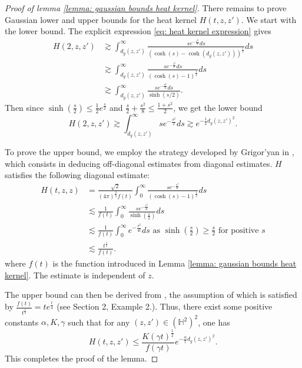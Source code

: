 \documentclass[letterpaper,11pt]{amsart}
\theoremstyle{note}
\numberwithin{equation}{section}
\begin{document}
\begin{proof}[Proof of lemma \ref{lemma: gaussian bounds heat kernel}]
    There remains to prove Gaussian lower and upper bounds for the heat kernel $H(t,z,z')$. We start with the lower bound. The explicit expression \eqref{eq: heat kernel expression} gives $$\begin{aligned}
        H(2,z,z') &\gtrsim \int_{d_g(z,z')}^\infty \frac{se^{-\frac{s^2}{8}}ds}{\left(\cosh(s) - \cosh(d_g(z,z'))\right)^\frac{1}{2}} ds \\
        &\gtrsim \int_{d_g(z,z')}^\infty \frac{se^{-\frac{s^2}{8}}ds}{\left(\cosh(s) - 1\right)^\frac{1}{2}} ds \\
        &\gtrsim \int_{d_g(z,z')}^\infty \frac{se^{-\frac{s^2}{8}}ds}{\sinh(s/2)}.
    \end{aligned}$$ Then since $\sinh(\frac{s}{2}) \leq \frac{1}{2} e^{\frac{s}{2}}$ and $\frac{s}{2} + \frac{s^2}{8} \leq \frac{1+s^2}{2}$, we get the lower bound $$H(2,z,z') \gtrsim \int_{d_g(z,z')}^\infty se^{-\frac{s^2}{2}} ds \gtrsim e^{-\frac{1}{2} d_g(z,z')^2}.$$

    To prove the upper bound, we employ the strategy developed by Grigor'yan in \cite[Section 5.1]{grigor'yan1997gaussianbounds,grigor'yan1999estimates_heatkernel_mfds}, which consists in deducing off-diagonal estimates from diagonal estimates. $H$ satisfies the following diagonal estimate: \begin{equation}
        \label{eq: diagonal estimate}
        \begin{aligned}
        H(t,z,z) &= \frac{\sqrt{2}}{(4\pi)^\frac{3}{2}f(t)} \int_0^\infty \frac{s e^{-\frac{s^2}{4t}}}{(\cosh(s) - 1)^\frac{1}{2}}ds \\
        &\lesssim \frac{1}{f(t)} \int_0^\infty \frac{s e^{-\frac{s^2}{4t}}}{\sinh(\frac{s}{2})} ds \\
        &\lesssim \frac{1}{f(t)} \int_0^\infty e^{-\frac{s^2}{4t}} ds \text{ as } \sinh\left(\frac{s}{2}\right) \geq \frac{s}{2} \text{ for positive } s \\
        &\lesssim \frac{t^\frac{1}{2}}{f(t)}.
        \end{aligned}
    \end{equation} where $f(t)$ is the function introduced in Lemma \ref{lemma: gaussian bounds heat kernel}. The estimate is independent of $z$.

    The upper bound can then be derived from \cite[Theorem 1.1]{grigor'yan1997gaussianbounds}, the assumption of which is satisfied by $\frac{f(t)}{t^\frac{1}{2}} = t e^{\frac{t}{4}}$ (see Section 2, Example 2.). Thus, there exist some positive constants $\alpha, K, \gamma$ such that for any $(z, z') \in \left(\mathbb{H}^2\right)^2$, one has $$H(t,z,z') \leq \frac{K(\gamma t)^\frac{1}{2}}{f(\gamma t)} e^{-\frac{\alpha}{t}d_g(z,z')^2}.$$ This completes the proof of the lemma.
\end{proof}
\end{document}
